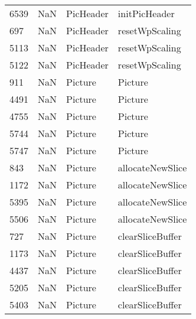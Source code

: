\begin{tabular}{llll}
6539 &                   NaN &                  PicHeader &                             initPicHeader \\
697  &                   NaN &                  PicHeader &                            resetWpScaling \\
5113 &                   NaN &                  PicHeader &                            resetWpScaling \\
5122 &                   NaN &                  PicHeader &                            resetWpScaling \\
911  &                   NaN &                    Picture &                                   Picture \\
4491 &                   NaN &                    Picture &                                   Picture \\
4755 &                   NaN &                    Picture &                                   Picture \\
5744 &                   NaN &                    Picture &                                   Picture \\
5747 &                   NaN &                    Picture &                                   Picture \\
843  &                   NaN &                    Picture &                          allocateNewSlice \\
1172 &                   NaN &                    Picture &                          allocateNewSlice \\
5395 &                   NaN &                    Picture &                          allocateNewSlice \\
5506 &                   NaN &                    Picture &                          allocateNewSlice \\
727  &                   NaN &                    Picture &                          clearSliceBuffer \\
1173 &                   NaN &                    Picture &                          clearSliceBuffer \\
4437 &                   NaN &                    Picture &                          clearSliceBuffer \\
5205 &                   NaN &                    Picture &                          clearSliceBuffer \\
5403 &                   NaN &                    Picture &                          clearSliceBuffer \\

\end{tabular}
